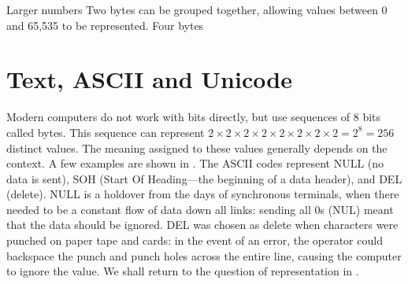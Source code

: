 
Larger numbers Two bytes can be grouped together, allowing values between 0 and
65,535 to be represented. Four bytes

\section{Text, ASCII and Unicode}\label{sec:letters}

Modern computers do not work with bits directly, but use sequences of
8 bits called bytes. This sequence can represent
$2\times2\times2\times2\times2\times2\times2\times2=2^8=256$ distinct
values. The meaning assigned to these values generally depends on the
context. A few examples are shown in . The ASCII
codes represent NULL (no data is sent), SOH (Start Of Heading---the
beginning of a data header), and DEL (delete). NULL is a holdover from
the days of synchronous terminals, when there needed to be a constant
flow of data down all links: sending all 0s (NUL) meant that the data
should be ignored. DEL was chosen as delete when characters were
punched on paper tape and cards: in the event of an error, the
operator could backspace the punch and punch holes across the entire
line, causing the computer to ignore the value. We shall return
to the question of representation in .

